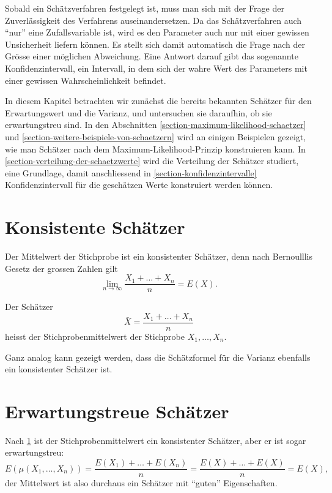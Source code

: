 Sobald ein Schätzverfahren festgelegt ist, muss man sich mit der Frage der
Zuverlässigkeit des Verfahrens auseinandersetzen.
Da das Schätzverfahren
auch ``nur'' eine Zufallsvariable ist, wird es den Parameter auch nur
mit einer gewissen Unsicherheit liefern können.
Es stellt sich damit
automatisch die Frage nach der Grösse einer möglichen Abweichung.
Eine Antwort darauf gibt das sogenannte Konfidenzintervall, ein
Intervall, in dem sich der wahre Wert des Parameters mit einer gewissen
Wahrscheinlichkeit befindet.

In diesem Kapitel betrachten wir zunächst die bereits bekannten 
Schätzer für den Erwartungswert und die Varianz, und untersuchen
sie daraufhin, ob sie erwartungstreu sind.
In den Abschnitten \ref{section-maximum-likelihood-schaetzer}
und \ref{section-weitere-beispiele-von-schaetzern} wird an einigen
Beispielen gezeigt, wie man Schätzer nach dem
Maximum-Likelihood-Prinzip konstruieren kann.
In \ref{section-verteilung-der-schaetzwerte}
wird die Verteilung der Schätzer studiert, eine Grundlage, damit
anschliessend in \ref{section-konfidenzintervalle} Konfidenzintervall
für die geschätzen Werte konstruiert werden können.

\section{Konsistente Schätzer} \label{section-konsistente-schaetzer}
Der Mittelwert der Stichprobe ist ein konsistenter Schätzer,
denn nach Bernoulllis Gesetz der grossen Zahlen gilt
\begin{equation}
\lim_{n\to\infty}\frac{X_1+\dots+X_n}{n}=E(X).
\end{equation}
\begin{definition}
Der Schätzer
\begin{equation}
\bar X=\frac{X_1+\dots+X_n}{n}
\end{equation}
heisst der Stichprobenmittelwert der Stichprobe $X_1,\dots,X_n$.
\end{definition}
Ganz analog kann gezeigt werden, dass die Schätzformel für die
Varianz ebenfalls ein konsistenter Schätzer ist.

\section{Erwartungstreue Schätzer} \label{section-erwartungstreue-schaetzer}
Nach \ref{section-konsistente-schaetzer} ist der Stichprobenmittelwert
ein konsistenter Schätzer,
aber er ist sogar erwartungstreu:
\[
E(\mu(X_1,\dots,X_n))=\frac{E(X_1)+\dots+E(X_n)}{n}=\frac{E(X)+\dots+E(X)}{n}
=E(X),
\]
der Mittelwert ist also durchaus ein Schätzer mit ``guten'' Eigenschaften.

